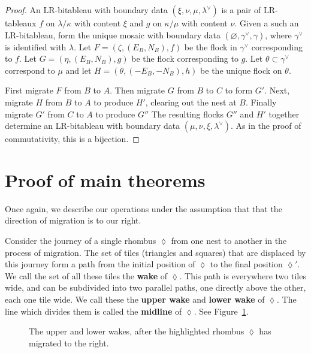 \documentclass[12pt]{article}
\begin{document}
\begin{proof}
An LR-bitableau with boundary data $(\xi, \nu, \mu, \lambda^\vee)$
is a pair of LR-tableaux $f$ on $\lambda/\kappa$ with content $\xi$
and $g$ on $\kappa/\mu$ with content $\nu$.
Given a such an LR-bitableau, form the unique mosaic with boundary 
data $(\varnothing, \gamma^\vee, \gamma)$, where $\gamma^\vee$ is identified 
with $\lambda$.  
Let
$F = (\zeta, (E_B, N_B), f)$ be the flock in $\gamma^\vee$ corresponding
to $f$. Let  $G = (\eta, (E_B, N_B), g)$ be the flock corresponding
to $g$. Let $\theta \subset \gamma^\vee$ correspond to $\mu$ and let 
$H = (\theta, (-E_B, -N_B), h)$ be the unique flock on $\theta$.

First migrate $F$ from $B$ to $A$. Then migrate $G$ from $B$ 
to $C$ to form $G'$. 
Next, migrate
$H$ from $B$ to $A$ to produce $H'$, clearing out the nest at $B$.
Finally migrate $G'$ from $C$ to $A$ to produce $G''$ 
The resulting flocks $G''$ and $H'$ together determine an
LR-bitableau with boundary data
$(\mu, \nu, \xi, \lambda^\vee)$.  As in the proof of commutativity,
this is a bijection.
\end{proof}

\section{Proof of main theorems}
\label{sec:proofs}

Once again, we describe our operations under the assumption that
that the direction of migration is to our right.

Consider the journey of a single rhombus $\lozenge$ from one nest to 
another in the process of migration.  The set of 
tiles (triangles and squares) that are displaced by this journey
form a path from the initial position of $\lozenge$ to 
the final position $\lozenge'$.  We call the set of all these
tiles the {\bf wake} of
$\lozenge$.  This path is everywhere two tiles wide, and 
can be subdivided into two parallel paths, one directly above the 
other, each one tile wide.  We call these the {\bf upper wake} and
{\bf lower wake} of $\lozenge$.  The line which divides them
is called the {\bf midline} of $\lozenge$.  See Figure~\ref{fig:wake}.

%
\begin{figure}[htbp]
\begin{center}
\caption{The upper and lower wakes, after the highlighted rhombus
$\lozenge$ has migrated to the right.}
\label{fig:wake}
\end{center}
\end{figure}
%
\end{document}
